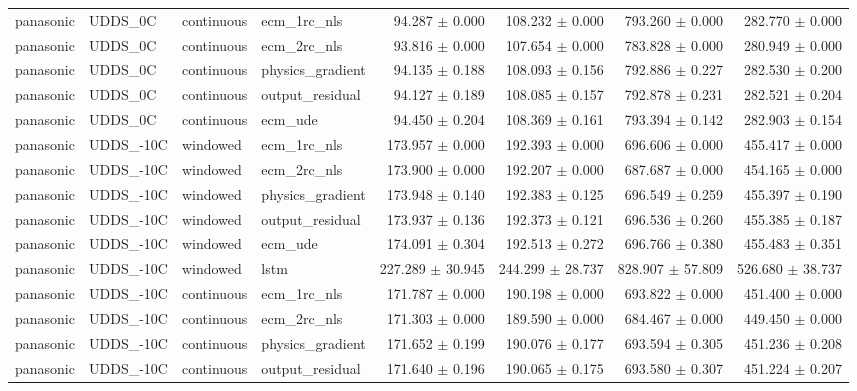 \begin{longtable}{llllrrrr}
panasonic & UDDS\_0C & continuous & ecm\_1rc\_nls & 94.287 $\pm$ 0.000 & 108.232 $\pm$ 0.000 & 793.260 $\pm$ 0.000 & 282.770 $\pm$ 0.000 \\
panasonic & UDDS\_0C & continuous & ecm\_2rc\_nls & 93.816 $\pm$ 0.000 & 107.654 $\pm$ 0.000 & 783.828 $\pm$ 0.000 & 280.949 $\pm$ 0.000 \\
panasonic & UDDS\_0C & continuous & physics\_gradient & 94.135 $\pm$ 0.188 & 108.093 $\pm$ 0.156 & 792.886 $\pm$ 0.227 & 282.530 $\pm$ 0.200 \\
panasonic & UDDS\_0C & continuous & output\_residual & 94.127 $\pm$ 0.189 & 108.085 $\pm$ 0.157 & 792.878 $\pm$ 0.231 & 282.521 $\pm$ 0.204 \\
panasonic & UDDS\_0C & continuous & ecm\_ude & 94.450 $\pm$ 0.204 & 108.369 $\pm$ 0.161 & 793.394 $\pm$ 0.142 & 282.903 $\pm$ 0.154 \\
panasonic & UDDS\_-10C & windowed & ecm\_1rc\_nls & 173.957 $\pm$ 0.000 & 192.393 $\pm$ 0.000 & 696.606 $\pm$ 0.000 & 455.417 $\pm$ 0.000 \\
panasonic & UDDS\_-10C & windowed & ecm\_2rc\_nls & 173.900 $\pm$ 0.000 & 192.207 $\pm$ 0.000 & 687.687 $\pm$ 0.000 & 454.165 $\pm$ 0.000 \\
panasonic & UDDS\_-10C & windowed & physics\_gradient & 173.948 $\pm$ 0.140 & 192.383 $\pm$ 0.125 & 696.549 $\pm$ 0.259 & 455.397 $\pm$ 0.190 \\
panasonic & UDDS\_-10C & windowed & output\_residual & 173.937 $\pm$ 0.136 & 192.373 $\pm$ 0.121 & 696.536 $\pm$ 0.260 & 455.385 $\pm$ 0.187 \\
panasonic & UDDS\_-10C & windowed & ecm\_ude & 174.091 $\pm$ 0.304 & 192.513 $\pm$ 0.272 & 696.766 $\pm$ 0.380 & 455.483 $\pm$ 0.351 \\
panasonic & UDDS\_-10C & windowed & lstm & 227.289 $\pm$ 30.945 & 244.299 $\pm$ 28.737 & 828.907 $\pm$ 57.809 & 526.680 $\pm$ 38.737 \\
panasonic & UDDS\_-10C & continuous & ecm\_1rc\_nls & 171.787 $\pm$ 0.000 & 190.198 $\pm$ 0.000 & 693.822 $\pm$ 0.000 & 451.400 $\pm$ 0.000 \\
panasonic & UDDS\_-10C & continuous & ecm\_2rc\_nls & 171.303 $\pm$ 0.000 & 189.590 $\pm$ 0.000 & 684.467 $\pm$ 0.000 & 449.450 $\pm$ 0.000 \\
panasonic & UDDS\_-10C & continuous & physics\_gradient & 171.652 $\pm$ 0.199 & 190.076 $\pm$ 0.177 & 693.594 $\pm$ 0.305 & 451.236 $\pm$ 0.208 \\
panasonic & UDDS\_-10C & continuous & output\_residual & 171.640 $\pm$ 0.196 & 190.065 $\pm$ 0.175 & 693.580 $\pm$ 0.307 & 451.224 $\pm$ 0.207 \\

\end{longtable}
